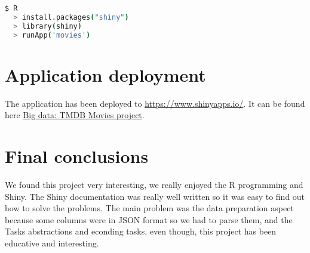 \noindent
\begin{lstlisting}[language=bash]
  $ R 
  > install.packages("shiny")
  > library(shiny)
  > runApp('movies')
\end{lstlisting}

\section{Application deployment}

The application has been deployed to \url{https://www.shinyapps.io/}. It can be found here \href{https://jruedas.shinyapps.io/movies/}{Big data: TMDB Movies project}.

\section{Final conclusions}

We found this project very interesting, we really enjoyed the R programming and Shiny. The Shiny documentation was really well written so it was easy to find out how to solve the problems. The main problem was the data preparation aspect because some columns were in JSON format so we had to parse them, and the Tasks abstractions and econding tasks, even though, this project has been educative and interesting.\\

